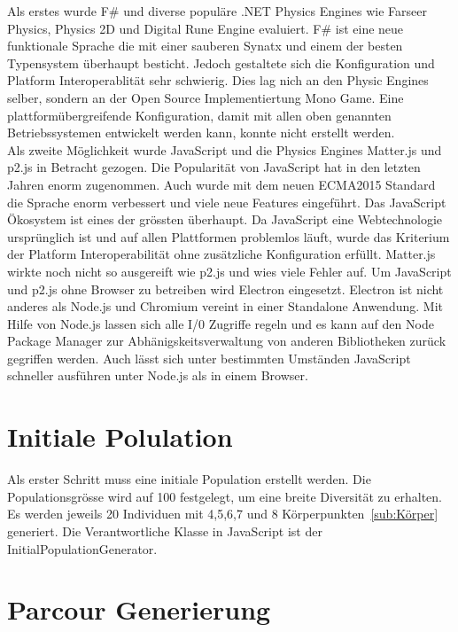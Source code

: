      Als erstes wurde F\# und diverse populäre .NET Physics Engines wie Farseer Physics, Physics 2D und Digital Rune Engine evaluiert.
     F\# ist eine neue funktionale Sprache die mit einer sauberen Synatx und einem der besten Typensystem überhaupt besticht.
     Jedoch gestaltete sich die Konfiguration und Platform Interoperablität sehr schwierig. Dies lag nich an den Physic Engines selber,
     sondern an der Open Source Implementiertung Mono Game. Eine plattformübergreifende Konfiguration,
     damit mit allen oben genannten Betriebssystemen entwickelt werden kann, konnte nicht erstellt werden.\\
     Als zweite Möglichkeit wurde JavaScript und die Physics Engines Matter.js und p2.js in Betracht gezogen.
     Die Popularität von JavaScript hat in den letzten Jahren enorm zugenommen.
     Auch wurde mit dem neuen ECMA2015 Standard die Sprache enorm verbessert und viele neue Features eingeführt. Das JavaScript Ökosystem ist eines der grössten überhaupt.
     Da JavaScript eine Webtechnologie ursprünglich ist und auf allen Plattformen problemlos läuft, wurde das Kriterium der Platform Interoperabilität ohne zusätzliche Konfiguration erfüllt.
     Matter.js wirkte noch nicht so ausgereift wie p2.js und wies viele Fehler auf. Um JavaScript und p2.js ohne Browser zu betreiben wird Electron eingesetzt.
     Electron ist nicht anderes als Node.js und Chromium vereint in einer Standalone Anwendung.
     Mit Hilfe von Node.js lassen sich alle I/0 Zugriffe regeln und es kann auf den Node Package Manager zur Abhänigskeitsverwaltung von anderen Bibliotheken zurück gegriffen werden.
     Auch lässt sich unter bestimmten Umständen JavaScript schneller ausführen unter Node.js als in einem Browser.

  \section{Initiale Polulation\label{sec:Initiale Polulation}}

    Als erster Schritt muss eine initiale Population erstellt werden. Die Populationsgrösse wird auf 100 festgelegt,
    um eine breite Diversität zu erhalten.
    Es werden jeweils 20 Individuen mit 4,5,6,7 und 8 Körperpunkten~\ref{sub:Körper} generiert.
    Die Verantwortliche Klasse in JavaScript ist der InitialPopulationGenerator.

  \section{Parcour Generierung\label{sec:Parcour Generierung}}

